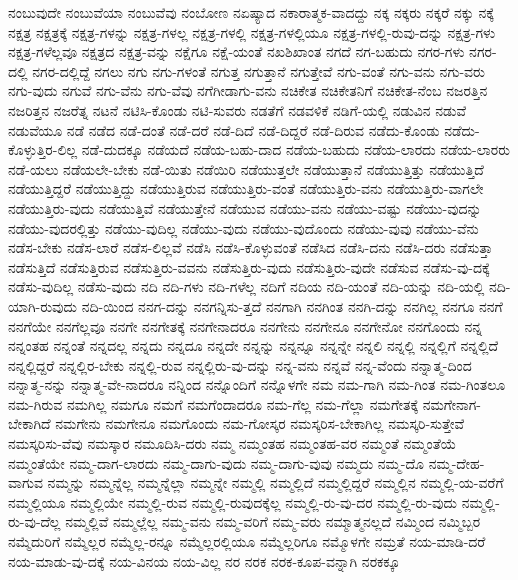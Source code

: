{ನಂಬುವುದೇ
ನಂಬುವೆಯಾ
ನಂಬುವೆವು
ನಂಬೋಣ
ನಏಷ್ಯಾದ
ನಕಾರಾತ್ಮಕ-ವಾದದ್ದು
ನಕ್ಕ
ನಕ್ಕರು
ನಕ್ಕರೆ
ನಕ್ಕು
ನಕ್ಕೆ
ನಕ್ಷತ್ರ
ನಕ್ಷತ್ರಕ್ಕೆ
ನಕ್ಷತ್ರ-ಗಳನ್ನು
ನಕ್ಷತ್ರ-ಗಳಲ್ಲ
ನಕ್ಷತ್ರ-ಗಳಲ್ಲಿ
ನಕ್ಷತ್ರ-ಗಳಲ್ಲಿಯೂ
ನಕ್ಷತ್ರ-ಗಳಲ್ಲಿ-ರುವು-ದನ್ನು
ನಕ್ಷತ್ರ-ಗಳು
ನಕ್ಷತ್ರ-ಗಳೆಲ್ಲವೂ
ನಕ್ಷತ್ರದ
ನಕ್ಷತ್ರ-ವನ್ನು
ನಕ್ಷೆಗೂ
ನಕ್ಷೆ-ಯಂತೆ
ನಖಶಿಖಾಂತ
ನಗದೆ
ನಗ-ಬಹುದು
ನಗರ-ಗಳು
ನಗರ-ದಲ್ಲಿ
ನಗರ-ದಲ್ಲಿದ್ದೆ
ನಗಲು
ನಗು
ನಗು-ಗಳಂತೆ
ನಗುತ್ತ
ನಗುತ್ತಾನೆ
ನಗುತ್ತೇವೆ
ನಗು-ವಂತೆ
ನಗು-ವನು
ನಗು-ವರು
ನಗು-ವುದು
ನಗುವೆ
ನಗು-ವೆನು
ನಗು-ವೆವು
ನಗೆಗೀಡಾಗು-ವನು
ನಚಿಕೇತ
ನಚಿಕೇತನಿಗೆ
ನಚಿಕೇತ-ನೆಂಬ
ನಜರತ್ತಿನ
ನಜರಿತ್ತನ
ನಜರೆತ್ನ
ನಟನೆ
ನಟಿಸಿ-ಕೊಂಡು
ನಟಿ-ಸುವರು
ನಡತೆಗೆ
ನಡವಳಿಕೆ
ನಡಿಗೆ-ಯಲ್ಲಿ
ನಡುವಿನ
ನಡುವೆ
ನಡುವೆಯೂ
ನಡೆ
ನಡೆದ
ನಡೆ-ದಂತೆ
ನಡೆ-ದರೆ
ನಡೆ-ದಿದೆ
ನಡೆ-ದಿದ್ದರೆ
ನಡೆ-ದಿರುವ
ನಡೆದು-ಕೊಂಡು
ನಡೆದು-ಕೊಳ್ಳುತ್ತಿರ-ಲಿಲ್ಲ
ನಡೆ-ದುದಕ್ಕೂ
ನಡೆಯದೆ
ನಡೆಯ-ಬಹು-ದಾದ
ನಡೆಯ-ಬಹುದು
ನಡೆಯ-ಲಾರದು
ನಡೆಯ-ಲಾರರು
ನಡೆ-ಯಲು
ನಡೆಯಲೇ-ಬೇಕು
ನಡೆ-ಯಿತು
ನಡೆಯಿರಿ
ನಡೆಯುತ್ತಲೇ
ನಡೆಯುತ್ತಾನೆ
ನಡೆಯುತ್ತಿತ್ತು
ನಡೆಯುತ್ತಿದೆ
ನಡೆಯುತ್ತಿದ್ದರೆ
ನಡೆಯುತ್ತಿದ್ದು
ನಡೆಯುತ್ತಿರುವ
ನಡೆಯುತ್ತಿರು-ವಂತೆ
ನಡೆಯುತ್ತಿರು-ವನು
ನಡೆಯುತ್ತಿರು-ವಾಗಲೇ
ನಡೆಯುತ್ತಿರು-ವುದು
ನಡೆಯುತ್ತಿವೆ
ನಡೆಯುತ್ತೇನೆ
ನಡೆಯುವ
ನಡೆಯು-ವನು
ನಡೆಯು-ವಷ್ಟು
ನಡೆಯು-ವುದನ್ನು
ನಡೆಯು-ವುದರಲ್ಲಿತ್ತು
ನಡೆಯು-ವುದಿಲ್ಲ
ನಡೆಯು-ವುದು
ನಡೆಯು-ವುದೊಂದು
ನಡೆಯು-ವುವು
ನಡೆಯು-ವೆನು
ನಡೆಸ-ಬೇಕು
ನಡೆಸ-ಲಾರೆ
ನಡೆಸ-ಲಿಲ್ಲವೆ
ನಡೆಸಿ
ನಡೆಸಿ-ಕೊಳ್ಳುವಂತೆ
ನಡೆಸಿದ
ನಡೆಸಿ-ದನು
ನಡೆಸಿ-ದರು
ನಡೆಸುತ್ತಾ
ನಡೆಸುತ್ತಿದೆ
ನಡೆಸುತ್ತಿರುವ
ನಡೆಸುತ್ತಿರು-ವವನು
ನಡೆಸುತ್ತಿರು-ವುದು
ನಡೆಸುತ್ತಿರು-ವುದೇ
ನಡೆಸುವ
ನಡೆಸು-ವು-ದಕ್ಕೆ
ನಡೆಸು-ವುದಿಲ್ಲ
ನಡೆಸು-ವುದು
ನದಿ
ನದಿ-ಗಳು
ನದಿ-ಗಳೆಲ್ಲ
ನದಿಗೆ
ನದಿಯ
ನದಿ-ಯಂತೆ
ನದಿ-ಯನ್ನು
ನದಿ-ಯಲ್ಲಿ
ನದಿ-ಯಾಗಿ-ರುವುದು
ನದಿ-ಯಿಂದ
ನನಗ-ದನ್ನು
ನನಗನ್ನಿಸು-ತ್ತದೆ
ನನಗಾಗಿ
ನನಗಿಂತ
ನನಗಿ-ದನ್ನು
ನನಗಿಲ್ಲ
ನನಗೂ
ನನಗೆ
ನನಗೆಯೇ
ನನಗೆಲ್ಲವೂ
ನನಗೇ
ನನಗೇತಕ್ಕೆ
ನನಗೇನಾದರೂ
ನನಗೇನು
ನನಗೇನೂ
ನನಗೇನೋ
ನನಗೊಂದು
ನನ್ನ
ನನ್ನಂತಹ
ನನ್ನಂತೆ
ನನ್ನದಲ್ಲ
ನನ್ನದು
ನನ್ನದೂ
ನನ್ನದೇ
ನನ್ನನ್ನು
ನನ್ನನ್ನೂ
ನನ್ನನ್ನೇ
ನನ್ನಲಿ
ನನ್ನಲ್ಲಿ
ನನ್ನಲ್ಲಿಗೆ
ನನ್ನಲ್ಲಿದೆ
ನನ್ನಲ್ಲಿದ್ದರೆ
ನನ್ನಲ್ಲಿರ-ಬೇಕು
ನನ್ನಲ್ಲಿ-ರುವ
ನನ್ನಲ್ಲಿರು-ವು-ದನ್ನು
ನನ್ನ-ವನು
ನನ್ನವೆ
ನನ್ನ-ವೆಂದು
ನನ್ನಾತ್ಮ-ದಿಂದ
ನನ್ನಾತ್ಮ-ನನ್ನು
ನನ್ನಾತ್ಮ-ವೇ-ನಾದರೂ
ನನ್ನಿಂದ
ನನ್ನೊಂದಿಗೆ
ನನ್ನೊಳಗೇ
ನಮ
ನಮ-ಗಾಗಿ
ನಮ-ಗಿಂತ
ನಮ-ಗಿಂತಲೂ
ನಮ-ಗಿರುವ
ನಮಗಿಲ್ಲ
ನಮಗೂ
ನಮಗೆ
ನಮಗೆಂದಾದರೂ
ನಮ-ಗೆಲ್ಲ
ನಮ-ಗೆಲ್ಲಾ
ನಮಗೇತಕ್ಕೆ
ನಮಗೇನಾಗ-ಬೇಕಾಗಿದೆ
ನಮಗೇನು
ನಮಗೇನೂ
ನಮಗೊಂದು
ನಮ-ಗೋಸ್ಕರ
ನಮಸ್ಕರಿಸ-ಬೇಕಾಗಿಲ್ಲ
ನಮಸ್ಕರಿ-ಸುತ್ತೇವೆ
ನಮಸ್ಕರಿಸು-ವೆವು
ನಮಸ್ಕಾರ
ನಮೂದಿಸಿ-ದರು
ನಮ್ಮ
ನಮ್ಮಂತಹ
ನಮ್ಮಂತಹ-ವರ
ನಮ್ಮಂತೆ
ನಮ್ಮಂತೆಯೆ
ನಮ್ಮಂತೆಯೇ
ನಮ್ಮ-ದಾಗ-ಲಾರದು
ನಮ್ಮ-ದಾಗು-ವುದು
ನಮ್ಮ-ದಾಗು-ವುವು
ನಮ್ಮದು
ನಮ್ಮ-ದೊ
ನಮ್ಮ-ದೇಹ-ವಾಗುವ
ನಮ್ಮನ್ನು
ನಮ್ಮನ್ನೆಲ್ಲ
ನಮ್ಮನ್ನೆಲ್ಲಾ
ನಮ್ಮನ್ನೇ
ನಮ್ಮಲ್ಲಿ
ನಮ್ಮಲ್ಲಿದೆ
ನಮ್ಮಲ್ಲಿದ್ದರೆ
ನಮ್ಮಲ್ಲಿನ
ನಮ್ಮಲ್ಲಿ-ಯ-ವರೆಗೆ
ನಮ್ಮಲ್ಲಿಯೂ
ನಮ್ಮಲ್ಲಿಯೇ
ನಮ್ಮಲ್ಲಿ-ರುವ
ನಮ್ಮಲ್ಲಿ-ರುವುದಕ್ಕೆಲ್ಲ
ನಮ್ಮಲ್ಲಿ-ರು-ವು-ದರ
ನಮ್ಮಲ್ಲಿ-ರು-ವುದು
ನಮ್ಮಲ್ಲಿ-ರು-ವು-ದೆಲ್ಲ
ನಮ್ಮಲ್ಲಿವೆ
ನಮ್ಮಲ್ಲೆಲ್ಲ
ನಮ್ಮ-ವನು
ನಮ್ಮ-ವರಿಗೆ
ನಮ್ಮ-ವರು
ನಮ್ಮಾತ್ಮನಲ್ಲದೆ
ನಮ್ಮಿಂದ
ನಮ್ಮಿಬ್ಬರ
ನಮ್ಮೆದುರಿಗೆ
ನಮ್ಮೆಲ್ಲರ
ನಮ್ಮೆಲ್ಲ-ರನ್ನೂ
ನಮ್ಮೆಲ್ಲರಲ್ಲಿಯೂ
ನಮ್ಮೆಲ್ಲರಿಗೂ
ನಮ್ಮೊಳಗೇ
ನಮ್ರತೆ
ನಯ-ಮಾಡಿ-ದರೆ
ನಯ-ಮಾಡು-ವು-ದಕ್ಕೆ
ನಯ-ವಿನಯ
ನಯ-ವಿಲ್ಲ
ನರ
ನರಕ
ನರಕ-ಕೂಪ-ವನ್ನಾಗಿ
ನರಕಕ್ಕೂ
}
